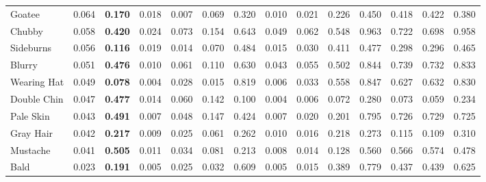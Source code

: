 \begin{tabular}{lrllrrrrrrrrrr}
 Goatee              & 0.064 & \bf 0.170 & 0.018     & 0.007 & 0.069 & 0.320 & 0.010 & 0.021 & 0.226 & 0.450 & 0.418 & 0.422 & 0.380 \\
 Chubby              & 0.058 & \bf 0.420 & 0.024     & 0.073 & 0.154 & 0.643 & 0.049 & 0.062 & 0.548 & 0.963 & 0.722 & 0.698 & 0.958 \\
 Sideburns           & 0.056 & \bf 0.116 & 0.019     & 0.014 & 0.070 & 0.484 & 0.015 & 0.030 & 0.411 & 0.477 & 0.298 & 0.296 & 0.465 \\
 Blurry              & 0.051 & \bf 0.476 & 0.010     & 0.061 & 0.110 & 0.630 & 0.043 & 0.055 & 0.502 & 0.844 & 0.739 & 0.732 & 0.833 \\
 Wearing Hat         & 0.049 & \bf 0.078 & 0.004     & 0.028 & 0.015 & 0.819 & 0.006 & 0.033 & 0.558 & 0.847 & 0.627 & 0.632 & 0.830 \\
 Double Chin         & 0.047 & \bf 0.477 & 0.014     & 0.060 & 0.142 & 0.100 & 0.004 & 0.006 & 0.072 & 0.280 & 0.073 & 0.059 & 0.234 \\
 Pale Skin           & 0.043 & \bf 0.491 & 0.007     & 0.048 & 0.147 & 0.424 & 0.007 & 0.020 & 0.201 & 0.795 & 0.726 & 0.729 & 0.725 \\
 Gray Hair           & 0.042 & \bf 0.217 & 0.009     & 0.025 & 0.061 & 0.262 & 0.010 & 0.016 & 0.218 & 0.273 & 0.115 & 0.109 & 0.310 \\
 Mustache            & 0.041 & \bf 0.505 & 0.011     & 0.034 & 0.081 & 0.213 & 0.008 & 0.014 & 0.128 & 0.560 & 0.566 & 0.574 & 0.478 \\
 Bald                & 0.023 & \bf 0.191 & 0.005     & 0.025 & 0.032 & 0.609 & 0.005 & 0.015 & 0.389 & 0.779 & 0.437 & 0.439 & 0.625 \\
\hline
\end{tabular}